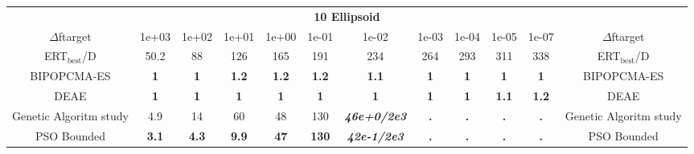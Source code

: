 \begin{tabular}{cccccccccccc}
 & \multicolumn{10}{c}{{\normalsize \textbf{10 Ellipsoid}}}\\
$\Delta$ftarget& 1e+03& 1e+02& 1e+01& 1e+00& 1e-01& 1e-02& 1e-03& 1e-04& 1e-05& 1e-07 & $\Delta$ftarget \\
ERT$_{\textrm{best}}$/D& 50.2& 88& 126& 165& 191& 234& 264& 293& 311& 338 & ERT$_{\textrm{best}}$/D \\
\hline
BIPOPCMA-ES & \textbf{1} & \textbf{1} & \textbf{1.2} & \textbf{1.2} & \textbf{1.2} & \textbf{1.1} & \textbf{1} & \textbf{1} & \textbf{1} & \textbf{1} & BIPOPCMA-ES \cite{add_an_entry_for_BIPOPCMA-ES_in_bbob.bib}\\
DEAE & \textbf{1} & \textbf{1} & \textbf{1} & \textbf{1} & \textbf{1} & \textbf{1} & \textbf{1} & \textbf{1} & \textbf{1.1} & \textbf{1.2} & DEAE \cite{add_an_entry_for_DEAE_in_bbob.bib}\\
Genetic Algoritm study & 4.9 & 14 & 60 & 48 & 130 & \textbf{\textit{46e+0}\textit{/2e3}} & \textbf{.} & \textbf{.} & \textbf{.} & \textbf{.} & Genetic Algoritm study \cite{add_an_entry_for_Genetic Algoritm study_in_bbob.bib}\\
PSO Bounded & \textbf{3.1} & \textbf{4.3} & \textbf{9.9} & \textbf{47} & \textbf{130} & \textbf{\textit{42e-1}\textit{/2e3}} & \textbf{.} & \textbf{.} & \textbf{.} & \textbf{.} & PSO Bounded \cite{add_an_entry_for_PSO Bounded_in_bbob.bib}
\end{tabular}

